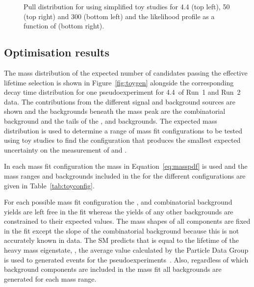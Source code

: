 {\begin{figure}[tbp]
  \caption{Pull distribution for \Gmumu using simplified toy studies for 4.4 (top left), 50 (top right) and 300 (bottom left) \fb and the likelihood profile as a function of \Gmumu (bottom right).}
    \label{fig:gammapulls}
\end{figure}




\subsection{Optimisation results}
\label{sec:toyresults}

The mass distribution of the expected number of \bsmumu candidates passing the effective lifetime selection is shown in Figure~\ref{fig:toygen} alongside the corresponding decay time distribution for one pseudoexperiment for 4.4~\fb of Run~1 and Run~2 data. 
The contributions from the different signal and background sources are shown and the backgrounds beneath the \bs mass peak are the combinatorial background and the tails of the \bhh, \bdmum and \lambdab backgrounds. The expected mass distribution is used to determine a range of mass fit configurations to be tested using toy studies to find the configuration that produces the smallest expected uncertainty on the measurement of \tmumu and \Gmumu.



In each mass fit configuration the mass \pdf in Equation~\ref{eq:masspdf} is used and the mass ranges and backgrounds included in the \pdf for the different configurations are given in Table~\ref{tab:toyconfig}.


For each possible mass fit configuration the \bsmumu, \bdmumu and combinatorial background yields are left free in the fit whereas the yields of any other backgrounds are constrained to their expected values. The mass shapes of all components are fixed in the \ml fit except the slope of the combinatorial background because this is not accurately known in data. 
The SM predicts that \tmumu is equal to the lifetime of the heavy \bs mass eigenstate, \tH, the average value calculated by the Particle Data Group is used to generated events for the pseudoexperiments~\cite{Olive:2016xmw}. %
Also, regardless of which background components are included in the mass fit all backgrounds are generated for each mass range. %

}

